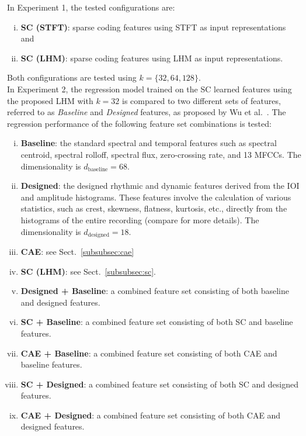 \documentclass{ws-ijsc}
\begin{document}
In Experiment 1, the tested configurations are:%
\begin{enumerate}[(i)]
\item \textbf{SC (STFT)}: sparse coding features using STFT as input representations and
\item \textbf{SC (LHM)}: sparse coding features using LHM as input representations.
\end{enumerate}
Both configurations are tested using $k = \{32, 64, 128\}$.\\

In Experiment 2, the regression model trained on the SC learned features using the proposed LHM with $k = 32$ is compared to two different sets of features, referred to as \textit{Baseline} and \textit{Designed} features, as proposed by Wu et al.~\cite{Wu2016}. The regression performance of the following feature set combinations is tested:
\begin{enumerate}[(i)]
\item \textbf{Baseline}: the standard spectral and temporal features such as spectral centroid, spectral rolloff, spectral flux, zero-crossing rate, and 13 MFCCs. The dimensionality is $d_\mathrm{baseline} = 68$.
\item \textbf{Designed}: the designed rhythmic and dynamic features derived from the IOI and amplitude histograms. These features involve the calculation of various statistics, such as crest, skewness, flatness, kurtosis, etc., directly from the histograms of the entire recording (compare \cite{Wu2016} for more details). The dimensionality is $d_\mathrm{designed} = 18$. 
\item \textbf{CAE}: see Sect.~\ref{subsubsec:cae}
\item \textbf{SC (LHM)}: see Sect.~\ref{subsubsec:sc}. %
\item \textbf{Designed + Baseline}: a combined feature set consisting of both baseline and designed features. %
\item \textbf{SC + Baseline}:  a combined feature set consisting of both SC and baseline features.
\item \textbf{CAE + Baseline}: a combined feature set consisting of both CAE and baseline features.
\item \textbf{SC + Designed}:  a combined feature set consisting of both SC and designed features.
\item \textbf{CAE + Designed}: a combined feature set consisting of both CAE and designed features.
\end{enumerate}
\end{document}
